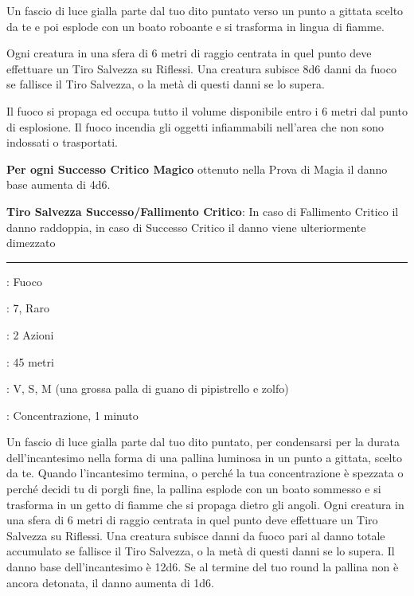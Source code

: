 \begin{multicols}{2}
Un fascio di luce gialla parte dal tuo dito puntato verso un punto a gittata scelto da te e poi esplode con un boato roboante e si trasforma in lingua di fiamme.

Ogni creatura in una sfera di 6 metri di raggio centrata in quel punto deve effettuare un Tiro Salvezza su Riflessi. Una creatura subisce 8d6 danni da fuoco se fallisce il Tiro Salvezza, o la metà di questi danni se lo supera.

Il fuoco si propaga ed occupa tutto il volume disponibile entro i 6 metri dal punto di esplosione. Il fuoco incendia gli oggetti infiammabili nell'area che non sono indossati o trasportati.

\textbf{Per ogni Successo Critico Magico} ottenuto nella Prova di Magia il danno base aumenta di 4d6.

\textbf{Tiro Salvezza Successo/Fallimento Critico}: In caso di Fallimento Critico il danno raddoppia, in caso di Successo Critico il danno viene ulteriormente dimezzato

\smallskip\noindent\rule{\linewidth}{2pt} \hypertarget{Palla di Fuoco Ritardata}{}\smallskip{}
\noindent
\begin{description}[noitemsep, topsep=0pt, parsep=0pt, partopsep=0pt, leftmargin=0cm, labelwidth=2.8cm]
	\item[\textbf{Lista di Magia}]: Fuoco
	\item[\textbf{Livello}]: 7, Raro
	\item[\textbf{T. di Lancio}]: 2 Azioni
	\item[\textbf{Gittata}]: 45 metri
	\item[\textbf{Componenti}]: V, S, M (una grossa palla di guano di pipistrello e zolfo)
	\item[\textbf{Durata}]: Concentrazione, 1 minuto
\end{description}

Un fascio di luce gialla parte dal tuo dito puntato, per condensarsi per la durata dell'incantesimo nella forma di una pallina luminosa in un punto a gittata, scelto da te. Quando l'incantesimo termina, o perché la tua concentrazione è spezzata o perché decidi tu di porgli fine, la pallina esplode con un boato sommesso e si trasforma in un getto di fiamme che si propaga dietro gli angoli. Ogni creatura in una sfera di 6 metri di raggio centrata in quel punto deve effettuare un Tiro Salvezza su Riflessi. Una creatura subisce danni da fuoco pari al danno totale accumulato se fallisce il Tiro Salvezza, o la metà di questi danni se lo supera. Il danno base dell'incantesimo è 12d6. Se al termine del tuo round la pallina non è ancora detonata, il danno aumenta di 1d6.


\end{multicols}
